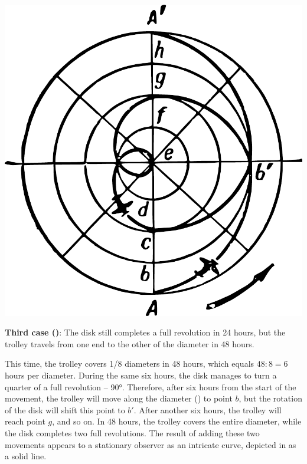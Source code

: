 \begin{marginfigure}[-2cm]%
\centering
\includegraphics[width=\textwidth]{figures/ch-09/fig-137.pdf}
\end{marginfigure}



\textbf{Third case ()}: The disk still completes a full revolution in 24 hours, but the trolley travels from one end to the other of the diameter in 48 hours.


This time, the trolley covers 1/8 diameters in 48 hours, which equals $48:8 = 6$ hours per diameter. During the same six hours, the disk manages to turn a quarter of a full revolution -- \ang{90}. Therefore, after six hours from the start of the movement, the trolley will move along the diameter () to point $b$, but the rotation of the disk will shift this point to $b'$. After another six hours, the trolley will reach point $g$, and so on. In 48 hours, the trolley covers the entire diameter, while the disk completes two full revolutions. The result of adding these two movements appears to a stationary observer as an intricate curve, depicted in  as a solid line.

